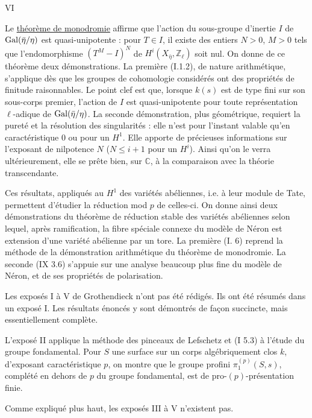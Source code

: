 \clearpage
\thispagestyle{empty}
\begin{center}
VI
\end{center}

Le \underline{théorème de monodromie} affirme que l'action du sous-groupe d'inertie $I$
de $\operatorname{Gal}(\bar\eta/\eta)$ est quasi-unipotente : pour $T\in I$, il existe des entiers $N>0$,
$M>0$ tels que l'endomorphisme $(T^M-I)^N$ de $H^i(X_{\bar\eta},\mathbb Z_\ell)$ soit nul. On donne de ce
théorème deux démonstrations. La première (I.1.2), de nature arithmétique, s'applique
dès que les groupes de cohomologie considérés ont des propriétés de finitude raisonnables.
Le point clef est que, lorsque $k(s)$ est de type fini sur son sous-corps
premier, l'action de $I$ est quasi-unipotente pour toute représentation $\ell$-adique de
$\operatorname{Gal}(\bar\eta/\eta)$. La seconde démonstration, plus géométrique, requiert la pureté et la résolution
des singularités : elle n'est pour l'instant valable qu'en caractéristique $0$
ou pour un $H^1$. Elle apporte de précieuses informations sur l'exposant de nilpotence
$N$ ($N\leq i+1$ pour un $H^i$). Ainsi qu'on le verra ultérieurement, elle se prête bien,
sur $\mathbb C$, à la comparaison avec la théorie transcendante.

Ces résultats, appliqués au $H^1$ des variétés abéliennes, i.e. à leur module
de Tate, permettent d'étudier la réduction mod $p$ de celles-ci. On donne ainsi deux
démonstrations du théorème de réduction stable des variétés abéliennes selon lequel,
après ramification, la fibre spéciale connexe du modèle de Néron est extension d'une
variété abélienne par un tore. La première (I. 6) reprend la méthode de la démonstration
arithmétique du théorème de monodromie. La seconde (IX 3.6) s'appuie sur une
analyse beaucoup plus fine du modèle de Néron, et de ses propriétés de polarisation.

Les exposés I à V de Grothendieck n'ont pas été rédigés. Ils ont été résumés
dans un exposé I. Les résultats énoncés y sont démontrés de façon succincte, mais
essentiellement complète.

L'exposé II applique la méthode des pinceaux de Lefschetz et (I 5.3) à
l'étude du groupe fondamental. Pour $S$ une surface sur un corps algébriquement clos
$k$, d'exposant caractéristique $p$, on montre que le groupe profini $\pi_1^{(p)}(S,s)$, complété
en dehors de $p$ du groupe fondamental, est de pro-$(p)$-présentation finie.

Comme expliqué plus haut, les exposés III à V n'existent pas.


